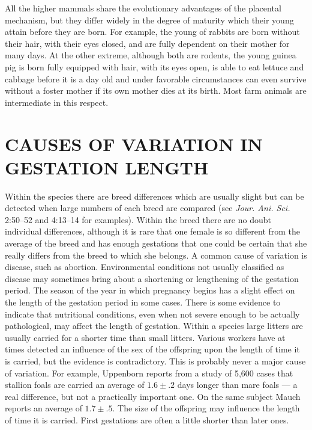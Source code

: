 All the higher mammals share the evolutionary advantages of the
placental mechanism, but they differ widely in the degree of maturity
which their young attain before they are born. For example, the young
of rabbits are born without their hair, with their eyes closed, and are
fully dependent on their mother for many days. At the other extreme,
although both are rodents, the young guinea pig is born fully equipped
with hair, with its eyes open, is able to eat lettuce and cabbage before it
is a day old and under favorable circumstances can even survive without
a foster mother if its own mother dies at its birth. Most farm animals
are intermediate in this respect.

\section*{CAUSES OF VARIATION IN GESTATION LENGTH}

Within the species there are breed differences which are usually
slight but can be detected when large numbers of each breed are compared
(see \textit{Jour. Ani. Sci.} 2:50--52 and 4:13--14 for examples).
Within the breed there are no doubt individual differences, although
it is rare that one female is so different from the average of the
breed and has enough gestations that one could be certain that she
really differs from the breed to which she belongs. A common cause of
variation is disease, such as abortion. Environmental conditions not
usually classified as disease may sometimes bring about a shortening or
lengthening of the gestation period. The season of the year in which
pregnancy begins has a slight effect on the length of the gestation period
in some cases. There is some evidence to indicate that nutritional conditions,
even when not severe enough to be actually pathological, may
affect the length of gestation. Within a species large litters are usually
carried for a shorter time than small litters. Various workers have at
times detected an influence of the sex of the offspring upon the length
of time it is carried, but the evidence is contradictory. This is probably
never a major cause of variation. For example, Uppenborn reports
from a study of 5,600 cases that stallion foals are carried an average of
$1.6 \pm .2$ days longer than mare foals --- a real difference, but not a practically
important one. On the same subject Mauch reports an average of
$1.7 \pm .5$. The size of the offspring may influence the length of time it
is carried. First gestations are often a little shorter than later ones.

